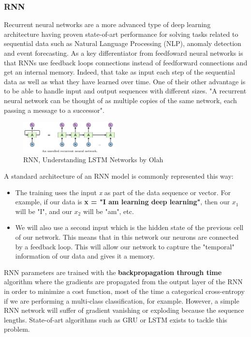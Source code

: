\documentclass[letter,8pt]{article}\usepackage[]{graphicx}\usepackage[]{color}
\begin{document}
\subsubsection{RNN}
Recurrent neural networks are a more advanced type of deep learning architecture having proven state-of-art performance for solving tasks related to sequential data such as Natural Language Processing (NLP), anomaly detection and event forecasting. As a key differentiator from feedfoward neural networks is that RNNs use feedback loops connections instead of feedforward connections and get an internal memory. Indeed, that take as input each step of the sequential data as well as what they have learned over time. One of their other advantage is to be able to handle input and output sequences with different sizes. "A recurrent neural network can be thought of as multiple copies of the same network, each passing a message to a successor"\cite{olah_2015}.
\begin{figure}
    \begin{center}
    \includegraphics[width=0.45\textwidth]{figure/RNN_process.png}
    \end{center}
     \caption{RNN, Understanding LSTM Networks by Olah}
     \label{fig:rnn_process}
\end{figure}

A standard architecture of an RNN model is commonly
represented this way:
\begin{itemize}
\item The training uses the input \textit{x} as part of the data sequence or vector. For example, if our data is \textbf{x = "I am learning deep learning"}, then our $x_1$ will be "I", and our $x_2$ will be "am", etc.
\item We will also use a second input which is the hidden state of the previous cell of our network. This means that in this network our neurons are connected by a feedback loop. This will allow our network to capture the "temporal" information of our data and gives it a memory. 
\end{itemize}

RNN parameters are trained with the \textbf{backpropagation through time} algorithm where the gradients are propagated from the output layer of the RNN in order to minimize a cost function, most of the time a categorical cross-entropy if we are performing a multi-class classification, for example. However, a simple RNN network will suffer of gradient vanishing or exploding because the sequence lengths. State-of-art algorithms such as GRU or LSTM exists to tackle this problem.  
\end{document}
